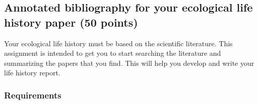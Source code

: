 \documentclass[12pt]{article}
\begin{document}
\thispagestyle{plain}


\subsection*{Annotated bibliography for your ecological life history paper (50 points)}

Your ecological life history must be based on the scientific literature. This assignment is intended to get you to start searching the literature and summarizing the papers that you find. This will help you develop and write your life history report. 

\subsubsection*{Requirements}
\end{document}

